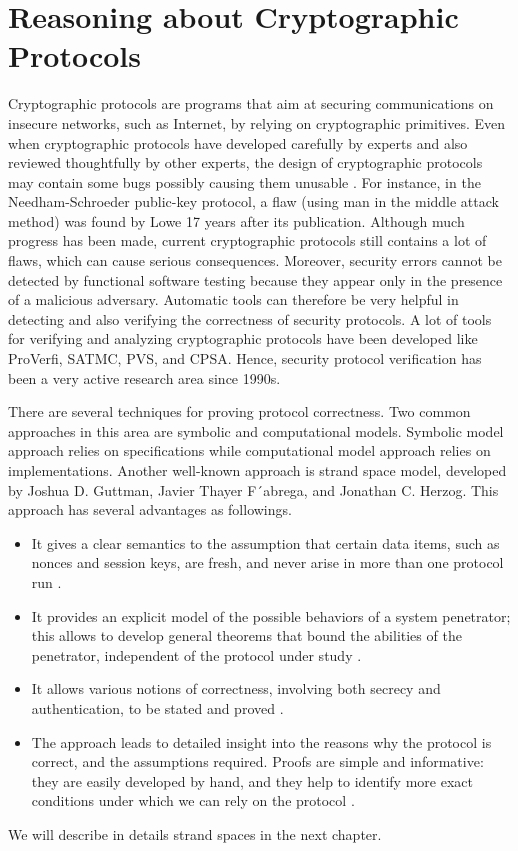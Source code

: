 \section {Reasoning about Cryptographic Protocols}
Cryptographic protocols are programs that aim at securing communications on insecure networks, such as Internet, by relying on cryptographic primitives. Even when cryptographic protocols have developed carefully by experts and also reviewed thoughtfully by other experts, the design of cryptographic protocols may contain some bugs possibly causing them unusable \cite{thayer1998strand}. For instance, in the Needham-Schroeder public-key protocol, a flaw (using man in the middle attack method) was found by Lowe 17 years after its publication. Although much progress has been made, current cryptographic protocols still contains a lot of flaws, which can cause serious consequences. Moreover, security errors cannot be detected by functional software testing because they appear only in the presence of a malicious adversary. Automatic tools can therefore be very helpful in detecting and also verifying the correctness of security protocols.  A lot of tools for verifying and analyzing cryptographic protocols have been developed like ProVerfi, SATMC, PVS, and CPSA. Hence, security protocol verification has been a very active research area since 1990s.

There are several techniques for proving protocol correctness. Two common approaches in this area are symbolic and computational models. Symbolic model approach relies on specifications while computational model approach relies on implementations. Another well-known approach is strand space model, developed by Joshua D. Guttman, Javier Thayer F´abrega, and Jonathan C. Herzog. This approach has several advantages as followings. 
\begin{itemize}
\item It gives a clear semantics to the assumption that certain data
items, such as nonces and session keys, are fresh, and never arise in more
than one protocol run \cite{ss}.
\item It provides an explicit model of the possible behaviors of a system
penetrator; this allows to develop general theorems that bound the
abilities of the penetrator, independent of the protocol under study \cite{ss}.
\item It allows various notions of correctness, involving both secrecy
and authentication, to be stated and proved \cite{ss}.
\item The approach leads to detailed insight into the reasons why
the protocol is correct, and the assumptions required. Proofs are simple
and informative: they are easily developed by hand, and they help to
identify more exact conditions under which we can rely on the protocol \cite{ss}.
\end{itemize} 
We will describe in details strand spaces in the next chapter.
 
